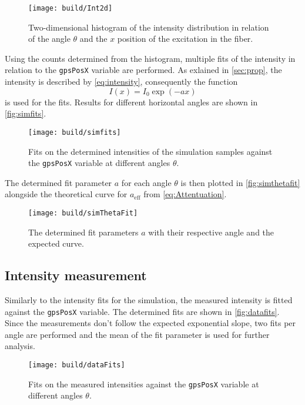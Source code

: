 \begin{figure}[H]
	\centering
	\texttt{[image: build/Int2d]}
	\caption{Two-dimensional histogram of the intensity distribution in relation of the angle $\theta$ and the $x$ position of the excitation in the fiber.}
	\label{fig:int2d}
\end{figure}

Using the counts determined from the histogram, multiple fits of the intensity in relation to the \texttt{gpsPosX} variable are performed. %
As exlained in \autoref{sec:prop}, the intensity is described by \eqref{eq:intensity}, consequently the function 
\begin{equation}
	I(x) = I_0 \exp\left(-ax\right)
\end{equation}
is used for the fits. Results for different horizontal angles are shown in \autoref{fig:simfits}.

\begin{figure}[H]
	\centering
	\texttt{[image: build/simfits]}
	\caption{Fits on the determined intensities of the simulation samples against the \texttt{gpsPosX} variable at different angles $\theta$.}
	\label{fig:simfits}
\end{figure}

The determined fit parameter $a$ for each angle $\theta$ is then plotted in \autoref{fig:simthetafit} alongside the theoretical curve for $a_{\mathrm{eff}}$ from \eqref{eq:Attentuation}.

\begin{figure}[H]
	\centering
	\texttt{[image: build/simThetaFit]}
	\caption{The determined fit parameters $a$ with their respective angle and the expected curve.}
	\label{fig:simthetafit}
\end{figure}

\subsection{Intensity measurement}
Similarly to the intensity fits for the simulation, the measured intensity is fitted against the \texttt{gpsPosX} variable. %
The determined fits are shown in \autoref{fig:datafits}. Since the measurements don't follow the expected exponential slope, two fits per angle are performed and the mean of the fit parameter is used for further analysis.


\begin{figure}[H]
	\centering
	\texttt{[image: build/dataFits]}
	\caption{Fits on the measured intensities against the \texttt{gpsPosX} variable at different angles $\theta$.}
	\label{fig:datafits}
\end{figure}

